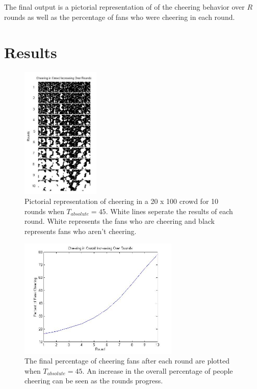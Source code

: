 \documentclass[oneside,12pt]{report}
\def\prefacesection#1{
\chapter*{#1}
\addcontentsline{toc}{chapter}{#1}
}
\begin{document}
\paragraph{}
The final output is a pictorial representation of of the cheering behavior over $R$ rounds as well as the percentage of fans who were cheering in each round.

\prefacesection{Results}

\begin{figure}[h]
    \begin{center}
        \includegraphics[height=2.5in]{sample_graph.jpg}
    \end{center}
    \caption[Pictorial representation of cheering with a lower absolute threshold.]{Pictorial representation of cheering in a 20 x 100 crowd for 10 rounds when $T_{absolute}=45$. White lines seperate the results of each round. White represents the fans who are cheering and black represents fans who aren't cheering.}
    \label{fig:graph1}
\end{figure}

\begin{figure}[h]
    \begin{center}
        \includegraphics[width=3in]{sample_graph2.jpg}
    \end{center}
    \caption[Plot of cheering levels over time in a simulated crowd with a lower absolute threshold.]{The final percentage of cheering fans after each round are plotted when $T_{absolute}=45$.  An increase in the overall percentage of people cheering can be seen as the rounds progress.}
    \label{fig:graph2}
\end{figure}
\end{document}
